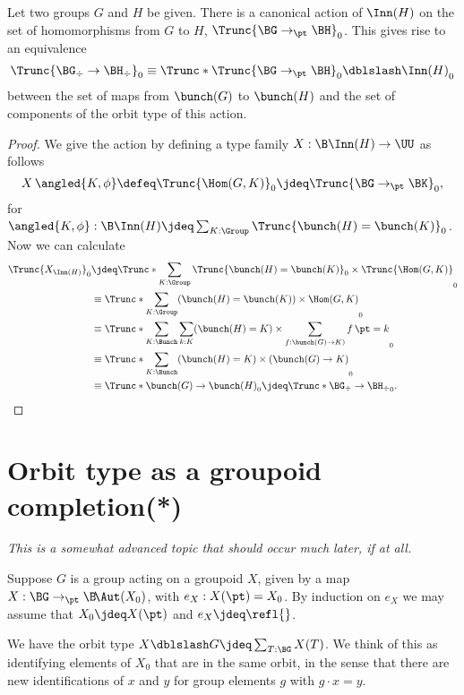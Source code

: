 \begin{theorem}
  Let two groups $G$ and $H$ be given.
  There is a canonical action of $\Inn(H)$
  on the set of homomorphisms from $G$ to $H$, $\Trunc{\BG \to_\pt \BH}_0$.
  This gives rise to an equivalence
  \[
    \Trunc{\BG_\div \to \BH_\div}_0 \equiv \Trunc*{\Trunc{\BG \to_\pt \BH}_0 \dblslash \Inn(H)}_0
  \]
  between the set of maps from $\bunch(G)$ to $\bunch(H)$ and the set of
  components of the orbit type of this action.
\end{theorem}
\begin{proof}
  We give the action by defining a type family $X : \B\Inn(H) \to \UU$ as follows
  \[
    X\, \angled{K,\phi} \defeq \Trunc{\Hom(G,K)}_0 \jdeq \Trunc{\BG \to_\pt \BK}_0,
  \]
  for $\angled{K,\phi} : \B\Inn(H) \jdeq \sum_{K : \Group} \Trunc{\bunch(H) = \bunch(K)}_0$.
  Now we can calculate
  \begin{align*}
    \Trunc{X_{\Inn(H)}}_0
    &\jdeq \Trunc*{\sum_{K:\Group}\Trunc{\bunch(H)=\bunch(K)}_0\times\Trunc{\Hom(G,K)}}_0 \\
    &\equiv \Trunc*{\sum_{K:\Group}(\bunch(H)=\bunch(K))\times\Hom(G,K)}_0 \\
    &\equiv \Trunc*{\sum_{K:\Bunch}\sum_{k:K}(\bunch(H)=K)\times\sum_{f:\bunch(G)\to K)}\mathop f \pt = k}_0 \\
    &\equiv \Trunc*{\sum_{K:\Bunch} (\bunch(H)=K) \times(\bunch(G) \to K)}_0 \\
    &\equiv \Trunc*{\bunch(G)\to\bunch(H)}_0 \jdeq \Trunc*{\BG_\div \to \BH_\div}_0.\qedhere
  \end{align*}
\end{proof}

\section{Orbit type as a groupoid completion(*)}

\emph{This is a somewhat advanced topic that should occur much later, if at all.}

\bigskip

Suppose $G$ is a group acting on a groupoid $X$,
given by a map $X : \BG \to_\pt \B\!\Aut(X_0)$,
with $e_X : X(\pt) = X_0$.
By induction on $e_X$ we may assume that $X_0\jdeq X(\pt)$
and $e_X\jdeq\refl{}$.

We have the orbit type $X\dblslash G \jdeq \sum_{T:\BG}X(T)$.
We think of this as identifying elements of $X_0$
that are in the same orbit,
in the sense that there are new identifications of $x$ and $y$
for group elements $g$ with $g\cdot x = y$.

